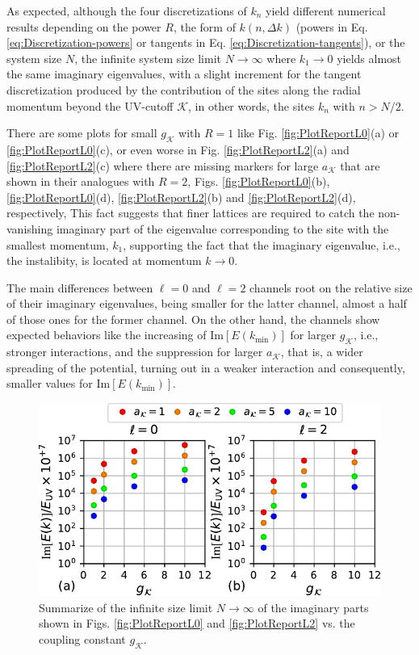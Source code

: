 \documentclass[english,aps,prd,nofootinbib,twocolumn]{revtex4-1}
\begin{document}
As expected, although the four discretizations of $k_{n}$ yield different numerical results depending on the power $R$, the form of $k(n,\Delta k)$ (powers in Eq. \eqref{eq:Discretization-powers} or tangents in Eq. \eqref{eq:Discretization-tangents}), or the system size $N$, the infinite system size limit $N\rightarrow \infty$ where $k_{1}\rightarrow 0$ yields almost the same imaginary eigenvalues, with a slight increment for the tangent discretization produced by the contribution of the sites along the radial momentum beyond the UV-cutoff $\mathcal{K}$, in other words, the sites $k_{n}$ with $n>N/2$.

There are some plots for small $g_{\mathcal{K}}$ with $R=1$ like Fig. \ref{fig:PlotReportL0}(a) or \ref{fig:PlotReportL0}(c), or even worse in Fig. \ref{fig:PlotReportL2}(a) and \ref{fig:PlotReportL2}(c) where there are missing markers for large $a_{\mathcal{K}}$ that are shown in their analogues with $R=2$, Figs. \ref{fig:PlotReportL0}(b), \ref{fig:PlotReportL0}(d), \ref{fig:PlotReportL2}(b) and \ref{fig:PlotReportL2}(d), respectively, This fact suggests that finer lattices are required to catch the non-vanishing imaginary part of the eigenvalue corresponding to the site with the smallest momentum, $k_{1}$, supporting the fact that the imaginary eigenvalue, i.e., the instalibity, is located at momentum $k\rightarrow 0$.

The main differences between $\ell=0$ and $\ell=2$ channels root on the relative size of their imaginary eigenvalues, being smaller for the latter channel, almost a half of those ones for the former channel. On the other hand, the channels show expected behaviors like the increasing of $\mathrm{Im}[E(k_{\mathrm{min}})]$ for larger $g_{\mathcal{K}}$, i.e., stronger interactions, and the suppression for larger $a_{\mathcal{K}}$, that is, a wider spreading of the potential, turning out in a weaker interaction and consequently, smaller values for $\mathrm{Im}[E(k_{\mathrm{min}})]$.

\begin{figure}
\centering
\includegraphics[scale=0.55]{./PlotReport/PlotReportTotal}
\caption{Summarize of the infinite size limit $N\rightarrow\infty$ of the imaginary parts shown in Figs. \ref{fig:PlotReportL0} and \ref{fig:PlotReportL2} vs. the coupling constant $g_{\mathcal{K}}$.}
\label{fig:PlotReport}
\end{figure}
\end{document}
